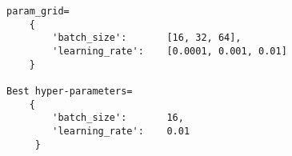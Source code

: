 \begin{lstlisting}
param_grid=
    {
        'batch_size':       [16, 32, 64],
        'learning_rate':    [0.0001, 0.001, 0.01]
    }

Best hyper-parameters=
    {
        'batch_size':       16, 
        'learning_rate':    0.01
     }
\end{lstlisting}
